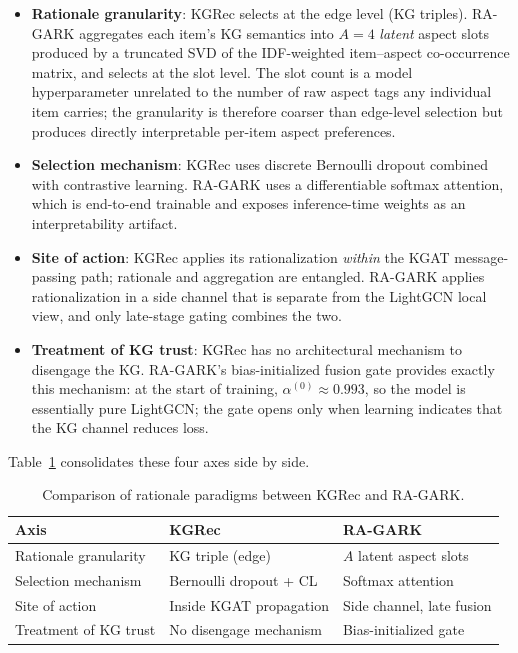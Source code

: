 \begin{itemize}
  \item \textbf{Rationale granularity}: KGRec selects at the edge level (KG triples). RA-GARK aggregates each item's KG semantics into $A=4$ \emph{latent} aspect slots produced by a truncated SVD of the IDF-weighted item--aspect co-occurrence matrix, and selects at the slot level. The slot count is a model hyperparameter unrelated to the number of raw aspect tags any individual item carries; the granularity is therefore coarser than edge-level selection but produces directly interpretable per-item aspect preferences.
  \item \textbf{Selection mechanism}: KGRec uses discrete Bernoulli dropout combined with contrastive learning. RA-GARK uses a differentiable softmax attention, which is end-to-end trainable and exposes inference-time weights as an interpretability artifact.
  \item \textbf{Site of action}: KGRec applies its rationalization \emph{within} the KGAT message-passing path; rationale and aggregation are entangled. RA-GARK applies rationalization in a side channel that is separate from the LightGCN local view, and only late-stage gating combines the two.
  \item \textbf{Treatment of KG trust}: KGRec has no architectural mechanism to disengage the KG. RA-GARK's bias-initialized fusion gate provides exactly this mechanism: at the start of training, $\alpha^{(0)} \approx 0.993$, so the model is essentially pure LightGCN; the gate opens only when learning indicates that the KG channel reduces loss.
\end{itemize}

Table~\ref{tab:rw-kgrec-vs-ragark} consolidates these four axes side by side.

\begin{table}[!htbp]
\centering
\caption{Comparison of rationale paradigms between KGRec and RA-GARK.}
\label{tab:rw-kgrec-vs-ragark}
\begin{tabular}{l l l}
\toprule
Axis & KGRec & RA-GARK \\
\midrule
Rationale granularity & KG triple (edge)         & $A$ latent aspect slots \\
Selection mechanism   & Bernoulli dropout + CL   & Softmax attention \\
Site of action        & Inside KGAT propagation  & Side channel, late fusion \\
Treatment of KG trust & No disengage mechanism   & Bias-initialized gate \\
\bottomrule
\end{tabular}
\end{table}
\FloatBarrier


